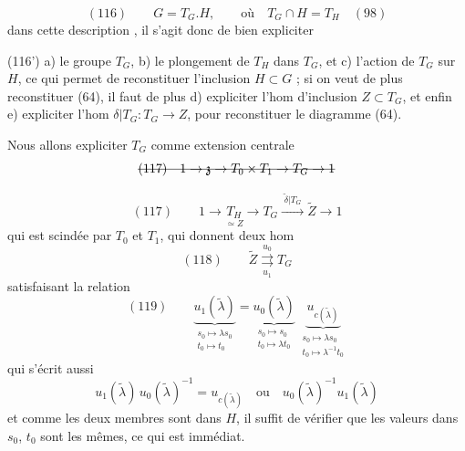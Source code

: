 \documentclass[11pt,a4paper]{article}
\begin{document}
 
\[
(116)\qquad G = T_G.H, \qquad \text{où}\quad T_G\cap H = T_H \quad (98)
\]
dans cette description , il s'agit donc de bien expliciter

(116') a) le groupe $T_G$, b) le plongement de $T_H$ dans $T_G$, et c) l'action de $T_G$ sur
$H$,  ce qui permet de reconstituer l'inclusion $H\subset G$ ; si on veut de plus
reconstituer (64), il faut de plus d) expliciter l'hom d'inclusion $Z\subset T_G$, et enfin
e) expliciter l'hom $\delta\vert T_G : T_G\to Z$, pour reconstituer le diagramme (64).

Nous allons expliciter $T_G$   comme extension
centrale
\[
\text{\struck{$(117)\quad 1\to\mathfrak{z}\to T_0\times T_1\to T_G\to 1$}}
\]
 
 

\[
(117)\qquad
1 \longrightarrow \underset{\simeq Z}{T_H}
\longrightarrow T_G \xrightarrow{\;\widetilde{\delta}\vert T_G\;} \widetilde{Z}
\longrightarrow 1
\]
qui est scindée par $T_0$ et $T_1$, qui donnent deux \struck{\ill{}} hom
\[
(118)\qquad \widetilde{Z} \underset{u_1}{\overset{u_0}{\rightrightarrows}} T_G
\]
satisfaisant la relation
\[
(119)\qquad
\underbrace{u_1(\widetilde{\lambda})}_{\substack{s_0\mapsto\lambda s_0\\ t_0\mapsto t_0}}
=
\underbrace{u_0(\widetilde{\lambda})}_{\substack{s_0\mapsto s_0\\ t_0\mapsto\lambda t_0}}
\;
\underbrace{u_{c(\widetilde{\lambda})}}_{\substack{s_0\mapsto\lambda s_0\\
t_0\mapsto\lambda^{-1}t_0}}
\]
qui s'écrit aussi
\[
u_1(\widetilde{\lambda})\,u_0(\widetilde{\lambda})^{-1} = u_{c(\widetilde{\lambda})}
\quad\text{ou}\quad u_0(\widetilde{\lambda})^{-1}u_1(\widetilde{\lambda})
\]
et comme les deux membres sont dans $H$, il suffit de vérifier que les valeurs dans $s_0$,
$t_0$ sont les mêmes, ce qui est immédiat.
\end{document}
